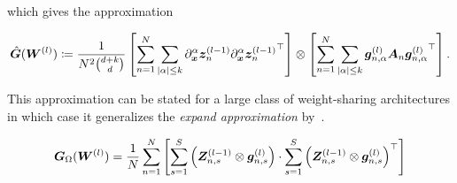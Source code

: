 which gives the approximation 
\begin{tcolorbox}[colframe=kfac, title={KFAC with general PDE terms},bottom=0mm,top=0mm,middle=0mm]
\begin{align*}\label{eq:KFAC-PINNs-general}
    \hat{\mG}%
    (\mW^{(l)})
    \coloneqq \frac{1}{N^2 \binom{d+k}{d}}
    \left[\sum_{n=1}^N \sum_{\lvert \alpha \rvert \le k} %
    \partial_\vx^\alpha \vz_n^{(l-1)} {\partial_\vx^\alpha \vz_n^{(l-1)}}^\top\right] 
    \otimes
    \left[\sum_{n=1}^N\sum_{\lvert \alpha \rvert \le k} \vg^{(l)}_{n,\alpha} \mA_n {\vg^{(l)}_{n,\alpha}}^\top \right]. 
\end{align*}
\end{tcolorbox}


This approximation can be stated for a large class of weight-sharing architectures in which case it generalizes the \emph{expand approximation} by~\citet{eschenhagen2023kroneckerfactored}. 




\begin{equation*}
    {\bm{G}}_\Omega({\bm{W}}^{(l)})
    =
    \frac1N\sum_{n=1}^N
    \left[\sum_{s=1}^S \left( {\bm{Z}}^{(l-1)}_{n,s}\otimes {\bm{g}}_{n,s}^{(l)} \right)
    \cdot
    \sum_{s=1}^S \left( {\bm{Z}}
    ^{(l-1)}_{n,s}\otimes {\bm{g}}_{n,s}^{(l)} \right)^\top\right]
\end{equation*}

%

